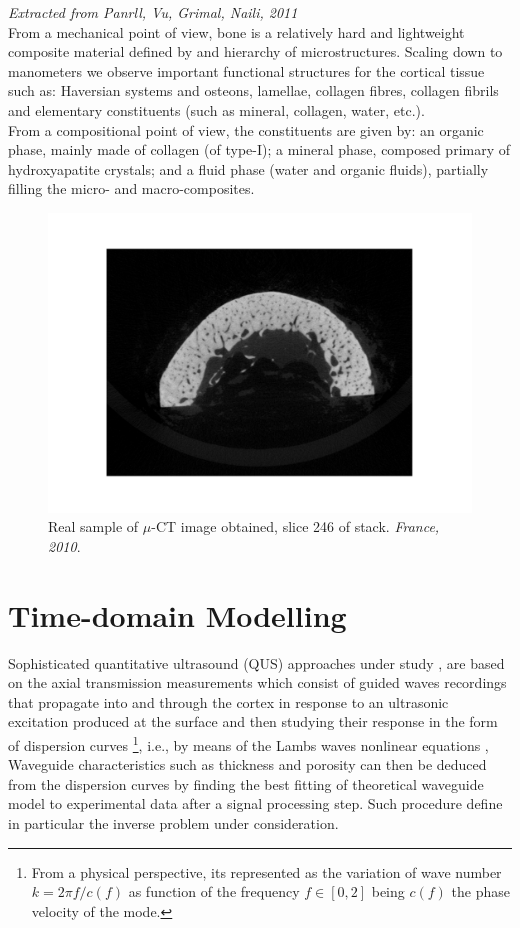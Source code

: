 \textit{Extracted from Panrll, Vu, Grimal, Naili, 2011} \\
From a mechanical point of view, bone is a relatively hard and lightweight composite material defined by and hierarchy of microstructures. Scaling down to manometers we observe important functional structures for the cortical tissue such as: Haversian systems and osteons, lamellae, collagen fibres, collagen fibrils and elementary constituents (such as mineral, collagen, water, etc.).\\
From a compositional point of view, the constituents are given by: an organic phase, mainly made of collagen (of type-I); a mineral phase, composed primary of hydroxyapatite crystals; and a fluid phase (water and organic fluids), partially filling the micro- and macro-composites.

\begin{figure}[!h]
	\centering
	\includegraphics[scale=.5]{images/ImgExt/246-2010_rec0964.pdf}
	\caption{Real sample of $\mu$-CT image obtained, slice 246 of stack. \textit{France, 2010}.}
	\label{muCT-Image}
\end{figure}

\section{Time-domain Modelling}

Sophisticated quantitative ultrasound (QUS) approaches under study \cite{Foiret2014} \cite{Minonzio2018}, are based on the axial transmission measurements which consist of guided waves recordings that propagate into and through the cortex in response to an ultrasonic excitation produced at the surface and then studying their response in the form of dispersion curves \footnote{From a physical perspective, its represented as the variation of wave number $k = 2 \pi f/c(f)$ as function of the frequency $f \in [0, 2]$ being $c(f)$ the phase velocity of the mode.}, i.e., by means of the Lambs waves nonlinear equations \cite{Rhee2007},
Waveguide characteristics such as thickness and porosity can then be deduced from the dispersion curves by finding the best fitting of theoretical waveguide model to experimental data after a signal processing step. Such procedure define in particular the inverse problem under consideration.

